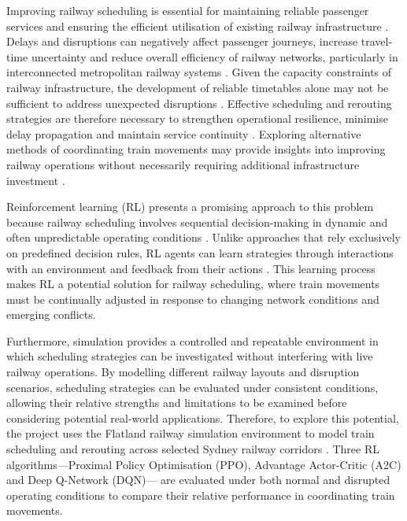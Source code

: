 \documentclass[11pt,a4paper]{article}
\begin{document}
Improving railway scheduling is essential for maintaining reliable passenger services and ensuring the efficient utilisation of existing railway infrastructure \parencite{semrov2016,zhu2019}. Delays and disruptions can negatively affect passenger journeys, increase travel-time uncertainty and reduce overall efficiency of railway networks, particularly in interconnected metropolitan railway systems \parencite{li2021}. Given the capacity constraints of railway infrastructure, the development of reliable timetables alone may not be sufficient to address unexpected disruptions \parencite{li2021}. Effective scheduling and rerouting strategies are therefore necessary to strengthen operational resilience, minimise delay propagation and maintain service continuity \parencite{zhu2019}. Exploring alternative methods of coordinating train movements may provide insights into improving railway operations without necessarily requiring additional infrastructure investment \parencite{semrov2016}.

Reinforcement learning (RL) presents a promising approach to this problem because railway scheduling involves sequential decision-making in dynamic and often unpredictable operating conditions \parencite{semrov2016}. Unlike approaches that rely exclusively on predefined decision rules, RL agents can learn strategies through interactions with an environment and feedback from their actions \parencite{sutton2018}. This learning process makes RL a potential solution for railway scheduling, where train movements must be continually adjusted in response to changing network conditions and emerging conflicts.

Furthermore, simulation provides a controlled and repeatable environment in which scheduling strategies can be investigated without interfering with live railway operations. By modelling different railway layouts and disruption scenarios, scheduling strategies can be evaluated under consistent conditions, allowing their relative strengths and limitations to be examined before considering potential real-world applications. Therefore, to explore this potential, the project uses the Flatland railway simulation environment to model train scheduling and rerouting across selected Sydney railway corridors \parencite{mohanty2020}. Three RL algorithms---Proximal Policy Optimisation (PPO), Advantage Actor-Critic (A2C) and Deep Q-Network (DQN)--- are evaluated under both normal and disrupted operating conditions to compare their relative performance in coordinating train movements.
\end{document}
